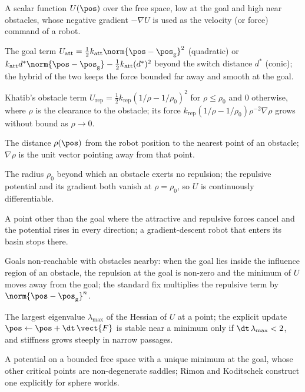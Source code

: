 \item[Artificial potential field] A scalar function $U(\pos)$ over the free space, low at the goal and high near obstacles, whose negative gradient $-\nabla U$ is used as the velocity (or force) command of a robot.
\item[Attractive potential] The goal term $U_{\mathrm{att}}=\tfrac12 k_{\mathrm{att}}\norm{\pos-\pos_{\mathrm{g}}}^2$ (quadratic) or $k_{\mathrm{att}}d^*\norm{\pos-\pos_{\mathrm{g}}}-\tfrac12 k_{\mathrm{att}}(d^*)^2$ beyond the switch distance $d^*$ (conic); the hybrid of the two keeps the force bounded far away and smooth at the goal.
\item[Repulsive potential] Khatib's obstacle term $U_{\mathrm{rep}}=\tfrac12 k_{\mathrm{rep}}(1/\rho-1/\rho_0)^2$ for $\rho\le\rho_0$ and $0$ otherwise, where $\rho$ is the clearance to the obstacle; its force $k_{\mathrm{rep}}(1/\rho-1/\rho_0)\rho^{-2}\nabla\rho$ grows without bound as $\rho\to0$.
\item[Clearance] The distance $\rho(\pos)$ from the robot position to the nearest point of an obstacle; $\nabla\rho$ is the unit vector pointing away from that point.
\item[Influence distance] The radius $\rho_0$ beyond which an obstacle exerts no repulsion; the repulsive potential and its gradient both vanish at $\rho=\rho_0$, so $U$ is continuously differentiable.
\item[Local minimum (of a potential field)] A point other than the goal where the attractive and repulsive forces cancel and the potential rises in every direction; a gradient-descent robot that enters its basin stops there.
\item[GNRON] Goals non-reachable with obstacles nearby: when the goal lies inside the influence region of an obstacle, the repulsion at the goal is non-zero and the minimum of $U$ moves away from the goal; the standard fix multiplies the repulsive term by $\norm{\pos-\pos_{\mathrm{g}}}^n$.
\item[Stiffness] The largest eigenvalue $\lambda_{\max}$ of the Hessian of $U$ at a point; the explicit update $\pos\gets\pos+\dt\,\vect{F}$ is stable near a minimum only if $\dt\,\lambda_{\max}<2$, and stiffness grows steeply in narrow passages.
\item[Navigation function] A potential on a bounded free space with a unique minimum at the goal, whose other critical points are non-degenerate saddles; Rimon and Koditschek construct one explicitly for sphere worlds.
